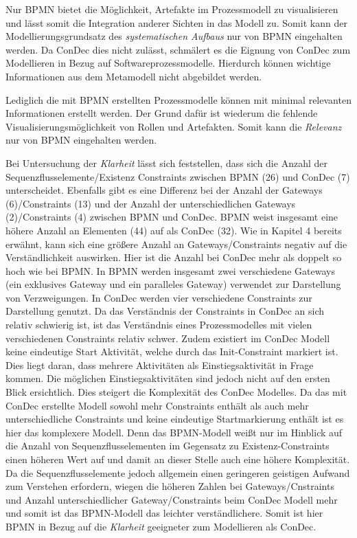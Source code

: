 Nur BPMN bietet die Möglichkeit, Artefakte im Prozessmodell zu visualisieren und lässt somit die Integration anderer Sichten in das Modell zu. Somit kann der Modellierungsgrundsatz des \textit{systematischen Aufbaus} nur von BPMN eingehalten werden. Da ConDec dies nicht zulässt, schmälert es die Eignung von ConDec zum Modellieren in Bezug auf Softwareprozessmodelle. Hierdurch können wichtige Informationen aus dem Metamodell nicht abgebildet werden. \newline 

Lediglich die mit BPMN erstellten Prozessmodelle können mit minimal relevanten Informationen erstellt werden. Der Grund dafür ist wiederum die fehlende Visualisierungsmöglichkeit von Rollen und Artefakten. Somit kann die \textit{Relevanz} nur von BPMN eingehalten werden.\newline




Bei Untersuchung der \textit{Klarheit} lässt sich feststellen, dass sich die Anzahl der Sequenzflusselemente/Existenz Constraints zwischen BPMN (26) und ConDec (7) unterscheidet. Ebenfalls gibt es eine Differenz bei der Anzahl der Gateways (6)/Constraints (13) und der Anzahl der unterschiedlichen Gateways (2)/Constraints (4) zwischen BPMN und ConDec. BPMN weist insgesamt eine höhere Anzahl an Elementen (44) auf als ConDec (32).\newline
Wie in Kapitel 4 bereits erwähnt, kann sich eine größere Anzahl an Gateways/Constraints negativ auf die Verständlichkeit auswirken. Hier ist die Anzahl bei ConDec mehr als doppelt so hoch wie bei BPMN. In BPMN werden insgesamt zwei verschiedene Gateways (ein exklusives Gateway und ein paralleles Gateway) verwendet zur Darstellung von Verzweigungen. In ConDec werden vier verschiedene Constraints zur Darstellung genutzt. Da das Verständnis der Constraints in ConDec an sich relativ schwierig ist, ist das Verständnis eines Prozessmodelles mit vielen verschiedenen Constraints relativ schwer. Zudem existiert im ConDec Modell keine eindeutige Start Aktivität, welche durch das Init-Constraint markiert ist. Dies liegt daran, dass mehrere Aktivitäten als Einstiegsaktivität in Frage kommen. Die möglichen Einstiegsaktivitäten sind jedoch nicht auf den ersten Blick ersichtlich. Dies steigert die Komplexität des ConDec Modelles. \newline
Da das mit ConDec erstellte Modell sowohl mehr Constraints enthält als auch mehr unterschiedliche Constraints und keine eindeutige Startmarkierung enthält ist es hier das komplexere Modell. Denn das BPMN-Modell weißt nur im Hinblick auf die Anzahl von Sequenzflusselementen im Gegensatz zu Existenz-Constraints einen höheren Wert auf und damit an dieser Stelle auch eine höhere Komplexität. Da die Sequenzflusselemente jedoch allgemein einen geringeren geistigen Aufwand zum Verstehen erfordern, wiegen die höheren Zahlen bei Gateways/Cnstraints und Anzahl unterschiedlicher Gateway/Constraints beim ConDec Modell mehr und somit ist das BPMN-Modell das leichter verständlichere.
\newline
Somit ist hier BPMN in Bezug auf die \textit{Klarheit} geeigneter zum Modellieren als ConDec.\newline


